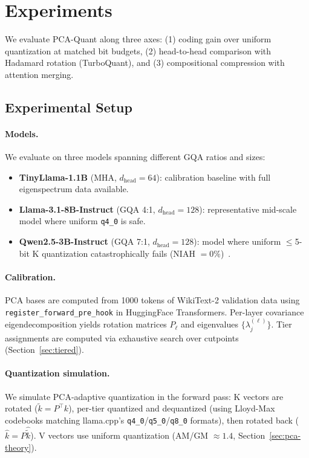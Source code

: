 \section{Experiments}
\label{sec:experiments}

We evaluate PCA-Quant along three axes: (1) coding gain over uniform quantization at matched bit budgets, (2) head-to-head comparison with Hadamard rotation (TurboQuant), and (3) compositional compression with attention merging.

\subsection{Experimental Setup}

\paragraph{Models.}
We evaluate on three models spanning different GQA ratios and sizes:
\begin{itemize}
    \item \textbf{TinyLlama-1.1B} (MHA, $d_{\text{head}} = 64$): calibration baseline with full eigenspectrum data available.
    \item \textbf{Llama-3.1-8B-Instruct} (GQA 4:1, $d_{\text{head}} = 128$): representative mid-scale model where uniform \texttt{q4\_0} is safe.
    \item \textbf{Qwen2.5-3B-Instruct} (GQA 7:1, $d_{\text{head}} = 128$): model where uniform $\leq$5-bit K quantization catastrophically fails (NIAH $= 0\%$)~\citep{paper1}.
\end{itemize}

\paragraph{Calibration.}
PCA bases are computed from 1000 tokens of WikiText-2 validation data using \texttt{register\_forward\_pre\_hook} in HuggingFace Transformers. Per-layer covariance eigendecomposition yields rotation matrices $P_\ell$ and eigenvalues $\{\lambda_j^{(\ell)}\}$. Tier assignments are computed via exhaustive search over cutpoints (Section~\ref{sec:tiered}).

\paragraph{Quantization simulation.}
We simulate PCA-adaptive quantization in the forward pass: K vectors are rotated ($\tilde{k} = P^\top k$), per-tier quantized and dequantized (using Lloyd-Max codebooks matching llama.cpp's \texttt{q4\_0}/\texttt{q5\_0}/\texttt{q8\_0} formats), then rotated back ($\hat{k} = P\hat{\tilde{k}}$). V vectors use uniform quantization (AM/GM $\approx 1.4$, Section~\ref{sec:pca-theory}).

